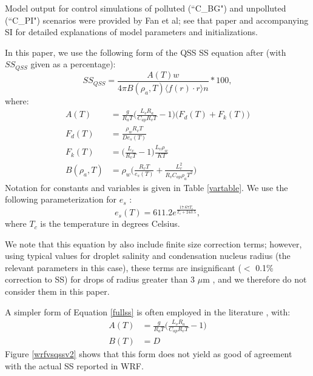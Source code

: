 \documentclass{article}
\begin{document}
Model output for control simulations of polluted (``C\_BG") and unpolluted (``C\_PI") scenarios were provided by Fan et al; see that paper and accompanying SI for detailed explanations of model parameters and initializations.

In this paper, we use the following form of the QSS SS equation after \cite{Rogers1989} (with $SS_{QSS}$ given as a percentage):
\begin{equation}
\label{fullss}
SS_{QSS} = \frac{A(T) w}{4\pi B(\rho_a, T) \langle f(r)\cdot r\rangle n}*100,
\end{equation}
where:
\begin{align}
A(T) &= \frac{g}{R_a T}\Big(\frac{L_v R_a}{C_{ap} R_v T} - 1\Big)\big(F_d(T) + F_k(T)\big)\nonumber\\
F_d(T) &= \frac{\rho_w R_v T}{D e_s(T)}\nonumber\\
F_k(T) &= \Big(\frac{L_v}{R_v T} - 1\Big)\frac{L_v \rho_w}{K T}\nonumber\\
B(\rho_a, T) &= \rho_w\Big(\frac{R_v T}{e_s(T)} + \frac{L_v^2}{R_v C_{ap} \rho_a T^2}\Big)
\end{align}
Notation for constants and variables is given in Table \ref{vartable}. We use the following parameterization for $e_s$ \cite{Rogers1989}:
\begin{equation}
e_s(T) = 611.2e^{\frac{17.67T_c}{T_c + 243.5}},
\end{equation}
where $T_c$ is the temperature in degrees Celsius.

We note that this equation by also include finite size correction terms; however, using typical values for droplet salinity and condensation nucleus radius (the relevant parameters in this case), these terms are insignificant ($<$ 0.1\% correction to SS) for drops of radius greater than 3 $\mu$m \cite{Rogers1989}, and we therefore do not consider them in this paper.

A simpler form of Equation \ref{fullss} is often employed in the literature \cite{Grabowski2020, Rogers1989}, with:
\begin{align}
A(T) &= \frac{g}{R_a T}\Big(\frac{L_v R_a}{C_{ap} R_v T} - 1\Big)\nonumber\\
B(T) &= D
\end{align}
Figure \ref{wrfvsqssv2} shows that this form does not yield as good of agreement with the actual SS reported in WRF.
\end{document}
